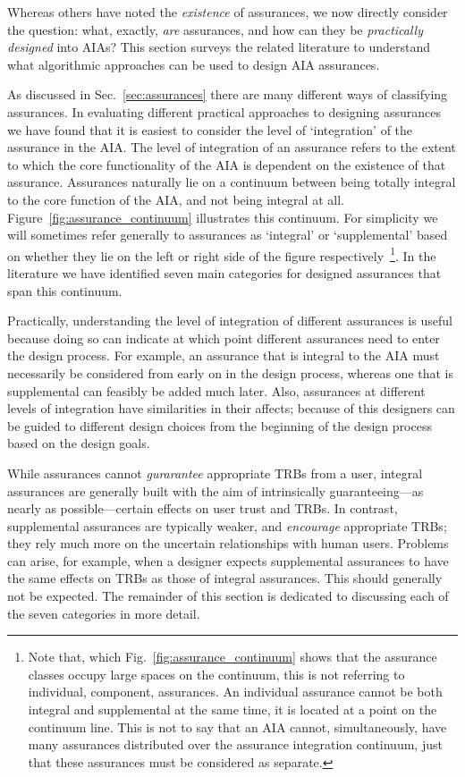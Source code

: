 Whereas others have noted the \textit{existence} of assurances, we now directly consider the question: what, exactly, \textit{are} assurances, and how can they be \textit{practically designed} into AIAs? 
This section surveys the related literature to understand what algorithmic approaches can be used to design AIA assurances. 

As discussed in Sec.~\ref{sec:assurances} there are many different ways of classifying assurances. In evaluating different practical approaches to designing assurances we have found that it is easiest to consider the level of `integration' of the assurance in the AIA. The level of integration of an assurance refers to the extent to which the core functionality of the AIA is dependent on the existence of that assurance. Assurances naturally lie on a continuum between being totally integral to the core function of the AIA, and not being integral at all. Figure~\ref{fig:assurance_continuum} illustrates this continuum. For simplicity we will sometimes refer generally to assurances as `integral' or `supplemental' based on whether they lie on the left or right side of the figure respectively~\footnote{Note that, which Fig.~\ref{fig:assurance_continuum} shows that the assurance classes occupy large spaces on the continuum, this is not referring to individual, component, assurances. An individual assurance cannot be both integral and supplemental at the same time, it is located at a point on the continuum line. This is not to say that an AIA cannot, simultaneously, have many assurances distributed over the assurance integration continuum, just that these assurances must be considered as separate.}. In the literature we have identified seven main categories for designed assurances that span this continuum.

Practically, understanding the level of integration of different assurances is useful because doing so can indicate at which point different assurances need to enter the design process. For example, an assurance that is integral to the AIA must necessarily be considered from early on in the design process, whereas one that is supplemental can feasibly be added much later. Also, assurances at different levels of integration have similarities in their affects; because of this designers can be guided to different design choices from the beginning of the design process based on the design goals.

While assurances cannot \emph{gurarantee} appropriate TRBs from a user, integral assurances are generally built with the aim of intrinsically guaranteeing---as nearly as possible---certain effects on user trust and TRBs. In contrast, supplemental assurances are typically weaker, and \emph{encourage} appropriate TRBs; they rely much more on the uncertain relationships with human users. Problems can arise, for example, when a designer expects supplemental assurances to have the same effects on TRBs as those of integral assurances. This should generally not be expected. The remainder of this section is dedicated to discussing each of the seven categories in more detail.

